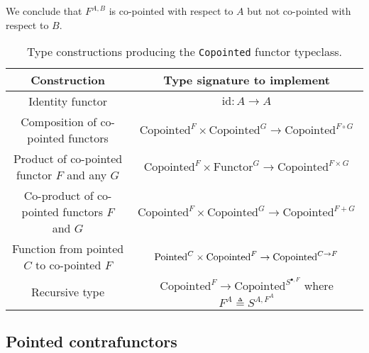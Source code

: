 We conclude that $F^{A,B}$ is co-pointed with respect to $A$ but
not co-pointed with respect to $B$.

\begin{table}
\begin{centering}
\begin{tabular}{|c|c|}
\hline 
\textbf{\footnotesize{}Construction} & \textbf{\footnotesize{}Type signature to implement}\tabularnewline
\hline 
\hline 
{\footnotesize{}Identity functor} & {\footnotesize{}$\text{id}:A\rightarrow A$}\tabularnewline
\hline 
{\footnotesize{}Composition of co-pointed functors} & {\footnotesize{}$\text{Copointed}^{F}\times\text{Copointed}^{G}\rightarrow\text{Copointed}^{F\circ G}$}\tabularnewline
\hline 
{\footnotesize{}Product of co-pointed functor $F$ and any $G$} & {\footnotesize{}$\text{Copointed}^{F}\times\text{Functor}^{G}\rightarrow\text{Copointed}^{F\times G}$}\tabularnewline
\hline 
{\footnotesize{}Co-product of co-pointed functors $F$ and $G$} & {\footnotesize{}$\text{Copointed}^{F}\times\text{Copointed}^{G}\rightarrow\text{Copointed}^{F+G}$}\tabularnewline
\hline 
{\footnotesize{}Function from pointed $C$ to co-pointed $F$} & {\footnotesize{}$\text{\ensuremath{\text{Pointed}^{C}}}\times\text{Copointed}^{F}\rightarrow\text{Copointed}^{C\rightarrow F}$}\tabularnewline
\hline 
{\footnotesize{}Recursive type} & {\footnotesize{}$\text{Copointed}^{F}\rightarrow\text{Copointed}^{S^{\bullet,F}}$
where $F^{A}\triangleq S^{A,F^{A}}$}\tabularnewline
\hline 
\end{tabular}
\par\end{centering}
\caption{Type constructions producing the \lstinline!Copointed! functor typeclass.\label{tab:Type-constructions-for-copointed-functor}}
\end{table}


\subsection{Pointed contrafunctors\label{subsec:Pointed-contrafunctors}}

